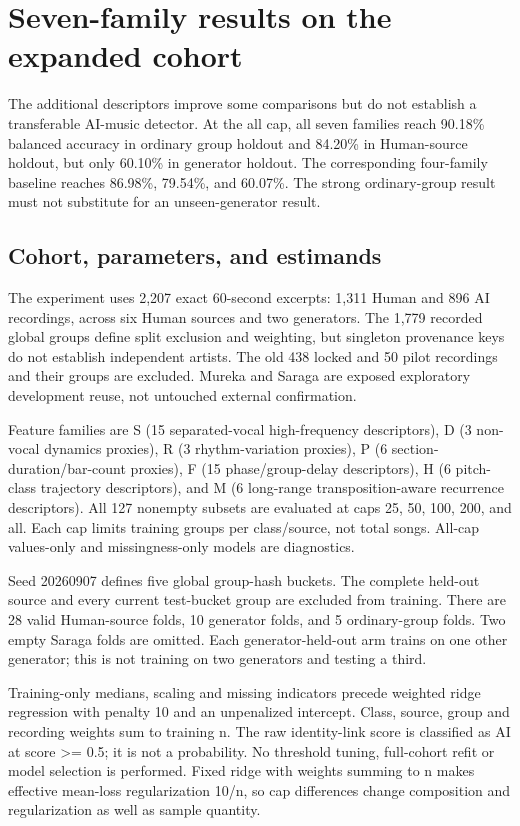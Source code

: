 \section{Seven-family results on the expanded cohort}
\label{sec:equal60-v5-results}
The additional descriptors improve some comparisons but do not establish a transferable AI-music detector. At the all cap, all seven families reach 90.18\% balanced accuracy in ordinary group holdout and 84.20\% in Human-source holdout, but only 60.10\% in generator holdout. The corresponding four-family baseline reaches 86.98\%, 79.54\%, and 60.07\%. The strong ordinary-group result must not substitute for an unseen-generator result.

\subsection{Cohort, parameters, and estimands}

The experiment uses 2,207 exact 60-second excerpts: 1,311 Human and 896 AI recordings, across six Human sources and two generators. The 1,779 recorded global groups define split exclusion and weighting, but singleton provenance keys do not establish independent artists. The old 438 locked and 50 pilot recordings and their groups are excluded. Mureka and Saraga are exposed exploratory development reuse, not untouched external confirmation.

Feature families are S (15 separated-vocal high-frequency descriptors), D (3 non-vocal dynamics proxies), R (3 rhythm-variation proxies), P (6 section-duration/bar-count proxies), F (15 phase/group-delay descriptors), H (6 pitch-class trajectory descriptors), and M (6 long-range transposition-aware recurrence descriptors). All 127 nonempty subsets are evaluated at caps 25, 50, 100, 200, and all. Each cap limits training groups per class/source, not total songs. All-cap values-only and missingness-only models are diagnostics.

Seed 20260907 defines five global group-hash buckets. The complete held-out source and every current test-bucket group are excluded from training. There are 28 valid Human-source folds, 10 generator folds, and 5 ordinary-group folds. Two empty Saraga folds are omitted. Each generator-held-out arm trains on one other generator; this is not training on two generators and testing a third.

Training-only medians, scaling and missing indicators precede weighted ridge regression with penalty 10 and an unpenalized intercept. Class, source, group and recording weights sum to training n. The raw identity-link score is classified as AI at score >= 0.5; it is not a probability. No threshold tuning, full-cohort refit or model selection is performed. Fixed ridge with weights summing to n makes effective mean-loss regularization 10/n, so cap differences change composition and regularization as well as sample quantity.


